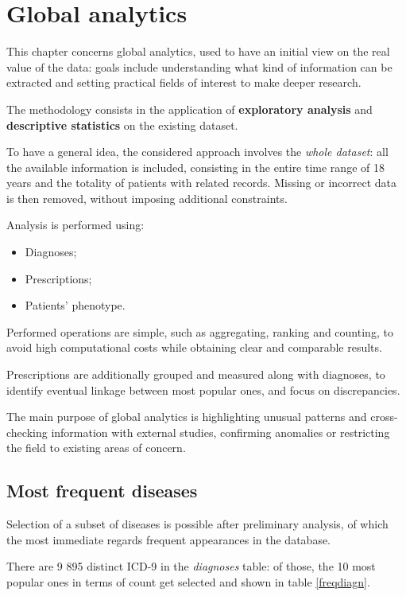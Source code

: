 \chapter{Global analytics}
This chapter concerns global analytics, used to have an initial view on the real value of the data: goals include understanding what kind of information can be extracted and setting practical fields of interest to make deeper research.

The methodology consists in the application of \textbf{exploratory analysis} and \textbf{descriptive statistics} on the existing dataset.

To have a general idea, the considered approach involves the \textit{whole dataset}: all the available information is included, consisting in the entire time range of 18 years and the totality of patients with related records. Missing or incorrect data is then removed, without imposing additional constraints.

Analysis is performed using:
\begin{itemize}
	\item Diagnoses;
	\item Prescriptions;
	\item Patients' phenotype.
\end{itemize}

Performed operations are simple, such as aggregating, ranking and counting, to avoid high computational costs while obtaining clear and comparable results.

Prescriptions are additionally grouped and measured along with diagnoses, to identify eventual linkage between most popular ones, and focus on discrepancies.

The main purpose of global analytics is highlighting unusual patterns and cross-checking information with external studies, confirming anomalies or restricting the field to existing areas of concern.

\section{Most frequent diseases}
Selection of a subset of diseases is possible after preliminary analysis, of which the most immediate regards frequent appearances in the database. 

There are 9 895 distinct ICD-9 in the \textit{diagnoses} table: of those, the 10 most popular ones in terms of count get selected and shown in table \ref{freqdiagn}.

